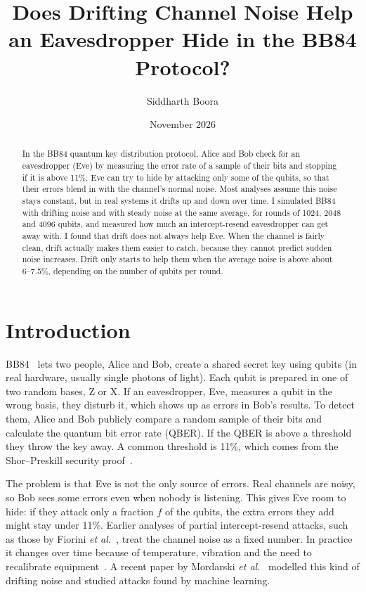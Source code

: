 \documentclass[11pt]{article}
\title{Does Drifting Channel Noise Help an Eavesdropper Hide in the BB84 Protocol?}
\author{Siddharth Boora}
\date{November 2026}
\begin{document}
\maketitle

\begin{abstract}
In the BB84 quantum key distribution protocol, Alice and Bob check for an eavesdropper (Eve) by measuring the error rate of a sample of their bits and stopping if it is above 11\%. Eve can try to hide by attacking only some of the qubits, so that their errors blend in with the channel's normal noise. Most analyses assume this noise stays constant, but in real systems it drifts up and down over time. I simulated BB84 with drifting noise and with steady noise at the same average, for rounds of 1024, 2048 and 4096 qubits, and measured how much an intercept-resend eavesdropper can get away with. I found that drift does not always help Eve. When the channel is fairly clean, drift actually makes them easier to catch, because they cannot predict sudden noise increases. Drift only starts to help them when the average noise is above about 6--7.5\%, depending on the number of qubits per round.
\end{abstract}

\section{Introduction}

BB84~\cite{BB84} lets two people, Alice and Bob, create a shared secret key using qubits (in real hardware, usually single photons of light). Each qubit is prepared in one of two random bases, Z or X. If an eavesdropper, Eve, measures a qubit in the wrong basis, they disturb it, which shows up as errors in Bob's results. To detect them, Alice and Bob publicly compare a random sample of their bits and calculate the quantum bit error rate (QBER). If the QBER is above a threshold they throw the key away. A common threshold is 11\%, which comes from the Shor--Preskill security proof~\cite{ShorPreskill}.

The problem is that Eve is not the only source of errors. Real channels are noisy, so Bob sees some errors even when nobody is listening. This gives Eve room to hide: if they attack only a fraction $f$ of the qubits, the extra errors they add might stay under 11\%. Earlier analyses of partial intercept-resend attacks, such as those by Fiorini \emph{et al.}~\cite{Fiorini24,Fiorini26}, treat the channel noise as a fixed number. In practice it changes over time because of temperature, vibration and the need to recalibrate equipment~\cite{YuanShields,PRTS}. A recent paper by Mordarski \emph{et al.}~\cite{Mordarski} modelled this kind of drifting noise and studied attacks found by machine learning.
\end{document}
